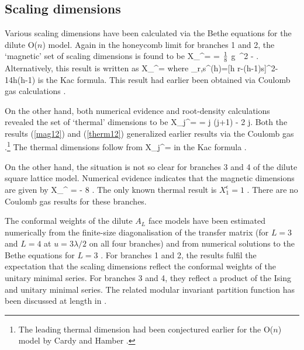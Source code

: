 \subsection{Scaling dimensions}

Various scaling dimensions have been calculated 
via the Bethe equations for the 
dilute O($n$) model.
Again in the honeycomb limit for branches 1 and 2, 
the `magnetic' set of scaling 
dimensions is found to be \cite{BB:88,Su:88,BB:89}
\beq
X_\ell^\sigma =  
   = {\mbox{$\textstyle {1 \over 8}$}} g\, \ell^2 - .
\label{mag12}
\eeq
Alternatively, this result is written as 
\beq
X_\ell^\sigma =
\eeq
where
\beq
\Delta_{r,s}^{(h)}={[h r-(h-1)s]^2-1\over 4h(h-1)}
\label{Delta}
\eeq
is the Kac formula. This result had earlier been obtained via 
Coulomb gas calculations \cite{Sal:86,D:87}.

On the other hand, both numerical evidence \cite{BB:89} and 
root-density calculations \cite{SNW:92} revealed the set of `thermal'
dimensions to be 
\beq
X_j^\epsilon =  
             =  j (j+1) - 2 j.
\label{therm12}
\eeq 
Both the results (\ref{mag12}) and (\ref{therm12}) 
generalized earlier results via the  
Coulomb gas \cite{N:82,N:84,N:87}.\footnote{The leading thermal
dimension had been conjectured earlier for the O($n$) model by 
Cardy and Hamber \cite{CH:80}.} 
The thermal dimensions follow from 
\beq
X_j^\epsilon =
\eeq
in the Kac formula \cite{BB:89}.


On the other hand, the situation is not so clear for branches 3 and 4 
of the dilute square lattice model. Numerical evidence \cite{WBN:92}
indicates that the magnetic dimensions are given by
\beq
X_\ell^{\sigma} =  - 
{8 \pi \lambda}. 
\label{mag34}
\eeq
The only known thermal result is $X_1^\epsilon = 1$ \cite{WBN:92}. 
There are no Coulomb gas results for these branches.

The conformal weights of the dilute $A_L$ face models have been
estimated numerically from the finite-size diagonalisation
of the transfer matrix (for $L=3$ and $L=4$ at $u=3\lambda/2$ on 
all four branches) \cite{OP:95} and from numerical 
solutions to the Bethe equations for $L=3$ \cite{GN:95}. 
For branches 1 and 2,
the results fulfil the expectation that the scaling dimensions 
reflect the conformal weights of the unitary minimal series. For 
branches 3 and 4, they reflect a product of the Ising and unitary minimal 
series. The related modular invariant partition function has been
discussed at length in \cite{OP:95}. 


